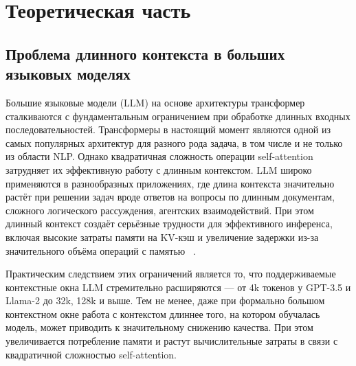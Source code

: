 \documentclass[a4paper,12pt]{extarticle}
\begin{document}


\newpage

\section{Теоретическая часть}

\subsection{Проблема длинного контекста в больших языковых моделях}

Большие языковые модели (LLM) на основе архитектуры трансформер ~\cite{transformer} сталкиваются с фундаментальным ограничением при обработке длинных входных последовательностей. Трансформеры в настоящий момент являются одной из самых популярных архитектур для разного рода задача, в том числе и не только из области NLP. Однако квадратичная сложность операции self-attention затрудняет их эффективную работу с длинным контекстом. LLM широко применяются в разнообразных приложениях, где длина контекста значительно растёт при решении задач вроде ответов на вопросы по длинным документам, сложного логического рассуждения, агентских взаимодействий. При этом длинный контекст создаёт серьёзные трудности для эффективного инференса, включая высокие затраты памяти на KV-кэш и увеличение задержки из-за значительного объёма операций с памятью ~\cite{kv_transfer}.

Практическим следствием этих ограничений является то, что поддерживаемые контекстные окна LLM стремительно расширяются — от 4k токенов у GPT-3.5 и Llama-2 до 32k, 128k и выше. Тем не менее, даже при формально большом контекстном окне работа с контекстом длиннее того, на котором обучалась модель, может приводить к значительному снижению качества. При этом увеличивается потребление памяти и растут вычислительные затраты в связи с квадратичной сложностью self-attention.
\end{document}
